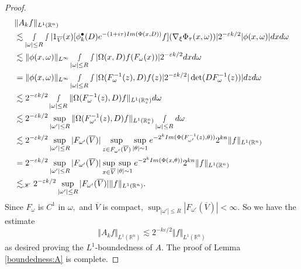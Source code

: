 \documentclass[10pt,a4paper]{amsart}
\begin{document}
\begin{proof}
\begin{align*}
    &\Vert A_k f\Vert_{L^1(\mathbb{R}^n)}  \\
    &\lesssim\smallint_{|\omega|\leq R}\smallint |1_{\overline{V}}(x)[\phi_{k}^\bullet(D)e^{-(1+i\tau)\textnormal{Im}(\Phi(x,D))}f](\nabla_\xi\Phi_\tau(x,\omega))|2^{-\varepsilon k/2}|\phi(x,\omega)|dx d\omega\\
    &\lesssim \Vert\phi(x,\omega)\Vert_{L^{\infty}} \smallint_{|\omega|\leq R}\smallint |\Omega(x,D)f(F_{\omega}(x))|2^{-\varepsilon k/2}dx d\omega\\
    &= \Vert\phi(x,\omega)\Vert_{L^{\infty}} \smallint_{|\omega|\leq R}\smallint |\Omega(F^{-1}_\omega(z),D)f(z)|2^{-\varepsilon k/2}|\det(DF_{\omega}^{-1}(z))|dz d\omega\\
    &\lesssim 2^{-\varepsilon k/2} \smallint_{|\omega|\leq R}\Vert\Omega(F^{-1}_\omega(z),D)f\Vert_{L^1(\mathbb{R}^n_z)}d\omega\\
    &\lesssim 2^{-\varepsilon k/2} \sup_{|\omega'|\leq R}\Vert\Omega(F^{-1}_{\omega'}(z),D)f\Vert_{L^1(\mathbb{R}^n_z)} \smallint_{|\omega|\leq R}d\omega\\
    & \lesssim 2^{-\varepsilon k/2} \sup_{|\omega'|\leq R} |F_{\omega'}(\overline{V})|\sup_{z\in F_{\omega'}(\overline{V})} \sup_{|\theta|\sim 1}e^{-2^{k}\textnormal{Im}(\Phi(F_{\omega'}^{-1}(z),\theta))}2^{kn}\Vert f\Vert_{L^1(\mathbb{R}^n)}\\
    &=2^{-\varepsilon k/2} \sup_{|\omega'|\leq R} |F_{\omega'}(\overline{V})|\sup_{x\in \overline{V}} \sup_{|\theta|\sim 1}e^{-2^{k}\textnormal{Im}(\Phi(x,\theta))}2^{kn}\Vert f\Vert_{L^1(\mathbb{R}^n)}\\
    &\lesssim_{\mathscr{K}} 2^{-\varepsilon k/2} \sup_{|\omega'|\leq R} |F_{\omega'}(\overline{V})|\Vert f\Vert_{L^1(\mathbb{R}^n)}.
\end{align*} Since $F_{\omega}$ is $C^1$ in $\omega,$ and $\overline{V}$ is compact, $ \sup_{|\omega'|\leq R} |F_{\omega'}(\overline{V})|<\infty.$ So we have the estimate
\begin{equation}
    \Vert A_k f\Vert_{L^1(\mathbb{R}^n)}\lesssim 2^{-k\varepsilon/2}\Vert f\Vert_{L^1(\mathbb{R}^n)}
\end{equation}as desired proving the $L^1$-boundedness of $A.$ The proof of Lemma \ref{boundedness:A} is complete.
\end{proof} 
\end{document}
